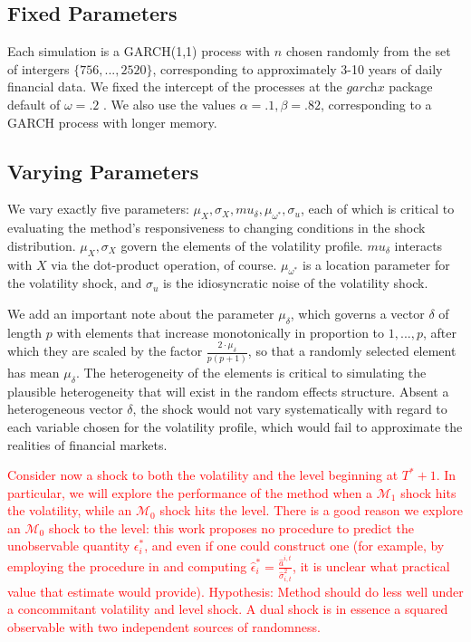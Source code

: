 \documentclass[11pt,3p,review,authoryear]{elsarticle}
\def\mc#1{\mathcal{#1}} %
\def\mc#1{\mathcal{#1}}
\theoremstyle{definition}
\begin{document}
  \subsection{Fixed Parameters}
Each simulation is a GARCH(1,1) process with $n$ chosen randomly from the set of intergers $\{756,...,2520\}$, corresponding to approximately 3-10 years of daily financial data.  We fixed the intercept of the processes at the $\textit{garchx}$ package default of $\omega = .2$ \citep{RePEc:pra:mprapa:100301}.  We also use the values $\alpha=.1, \beta = .82$, corresponding to a GARCH process with longer memory.
  \subsection{Varying Parameters}

  We vary exactly five parameters: $\mu_{X}, \sigma_{X}, mu_{\delta}, \mu_{\omega^{*}}, \sigma_{u}$, each of which is critical to evaluating the method's responsiveness to changing conditions in the shock distribution. $\mu_{X}, \sigma_{X}$ govern the elements of the volatility profile. $mu_{\delta}$ interacts with $X$ via the dot-product operation, of course.  $\mu_{\omega^{*}}$ is a location parameter for the volatility shock, and $\sigma_{u}$ is the idiosyncratic noise of the volatility shock.
  
  We add an important note about the parameter $\mu_{\delta}$, which governs a vector $\delta$ of length $p$ with elements that increase monotonically in proportion to $1,...,p$, after which they are scaled by the factor $\frac{2\cdot\mu_{\delta}}{p(p+1)}$, so that a randomly selected element has mean $\mu_{\delta}$.  The heterogeneity of the elements is critical to simulating the plausible heterogeneity that will exist in the random effects structure.  Absent a heterogeneous vector $\delta$, the shock would not vary systematically with regard to each variable chosen for the volatility profile, which would fail to approximate the realities of financial markets.

\textcolor{red}{
Consider now a shock to both the volatility and the level beginning at $T^{*}+1$.  In particular, we will explore the performance of the method when a  $\mc{M}_{1}$ shock hits the volatility, while an $\mc{M}_{0}$ shock hits the level. There is a good reason we explore an $\mc{M}_{0}$ shock to the level: this work proposes no procedure to predict the unobservable quantity $\epsilon^{*}_{i}$, and even if one could construct one (for example, by employing the procedure in \cite{lin2021minimizing} and computing $\hat\epsilon^{*}_{i} = \frac{\hat a^{i,t}}{\hat\sigma^2_{i,t}}$, it is unclear what practical value that estimate would provide).  Hypothesis: Method should do less well under a concommitant volatility and level shock.  A dual shock is in essence a squared observable with two independent sources of randomness.}
\end{document}
